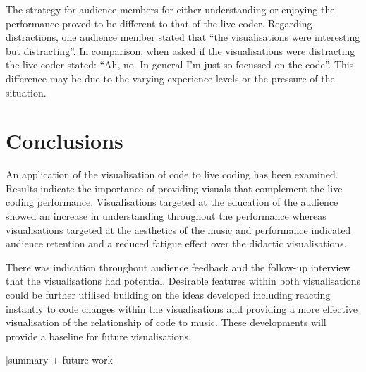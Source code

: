 \documentclass{sig-alternate}
\begin{document}
The strategy for audience members for either understanding or enjoying the performance proved to be different to that of the live coder. Regarding distractions, one audience member stated that ``the visualisations were interesting but distracting''. In comparison, when asked if the visualisations were distracting the live coder stated: ``Ah, no. In general I'm just so focussed on the code''. This difference may be due to the varying experience levels or the pressure of the situation.

\section{Conclusions}
An application of the visualisation of code to live coding has been examined. Results indicate the importance of providing visuals that complement the live coding performance. Visualisations targeted at the education of the audience showed an increase in understanding throughout the performance whereas visualisations targeted at the aesthetics of the music and performance indicated audience retention and a reduced fatigue effect over the didactic visualisations.

There was indication throughout audience feedback and the follow-up interview that the visualisations had potential. Desirable features within both visualisations could be further utilised building on the ideas developed including reacting instantly to code changes within the visualisations and providing a more effective visualisation of the relationship of code to music. These developments will provide a baseline for future visualisations.

{\color{red}[summary + future work]}


\end{document}
